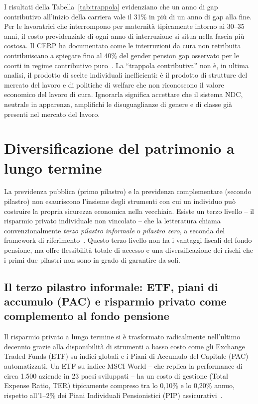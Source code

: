 I risultati della Tabella~\ref{tab:trappola} evidenziano che un anno di
gap contributivo all'inizio della carriera vale il 31\% in più di un anno
di gap alla fine. Per le lavoratrici che interrompono per maternità
tipicamente intorno ai 30--35 anni, il costo previdenziale di ogni anno
di interruzione si situa nella fascia più costosa. Il CERP ha documentato
come le interruzioni da cura non retribuita contribuiscano a spiegare fino
al 40\% del gender pension gap osservato per le coorti in regime contributivo
puro~\cite{Raitano2022, ForneroMonticone2011}. La ``trappola contributiva''
non è, in ultima analisi, il prodotto di scelte individuali inefficienti: è
il prodotto di strutture del mercato del lavoro e di politiche di welfare che
non riconoscono il valore economico del lavoro di cura. Ignorarla significa
accettare che il sistema NDC, neutrale in apparenza, amplifichi le
disuguaglianze di genere e di classe già presenti nel mercato del lavoro.

\section{Diversificazione del patrimonio a lungo termine}
\label{sec:diversificazione}

La previdenza pubblica (primo pilastro) e la previdenza complementare
(secondo pilastro) non esauriscono l'insieme degli strumenti con cui un
individuo può costruire la propria sicurezza economica nella vecchiaia. Esiste
un terzo livello -- il risparmio privato individuale non vincolato -- che
la letteratura chiama convenzionalmente \emph{terzo pilastro informale}
o \emph{pilastro zero}, a seconda del framework di riferimento~\cite{WorldBank2005}.
Questo terzo livello non ha i vantaggi fiscali del fondo pensione, ma offre
flessibilità totale di accesso e una diversificazione dei rischi che i
primi due pilastri non sono in grado di garantire da soli.

\subsection{Il terzo pilastro informale:
            ETF, piani di accumulo (PAC) e risparmio privato
            come complemento al fondo pensione}
\label{subsec:terzo_pilastro}

Il risparmio privato a lungo termine si è trasformato radicalmente
nell'ultimo decennio grazie alla disponibilità di strumenti a basso costo
come gli Exchange Traded Funds (ETF) su indici globali e i Piani di
Accumulo del Capitale (PAC) automatizzati. Un ETF su indice MSCI World --
che replica la performance di circa 1.500 aziende in 23 paesi sviluppati --
ha un costo di gestione (Total Expense Ratio, TER) tipicamente compreso
tra lo 0,10\% e lo 0,20\% annuo, rispetto all'1--2\% dei Piani Individuali
Pensionistici (PIP) assicurativi~\cite{COVIP2024}.

